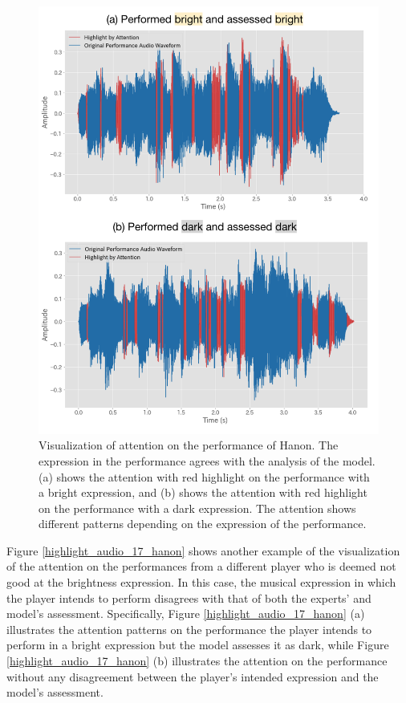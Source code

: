 \begin{figure}[h!]
  \centering
  \includegraphics[width=\linewidth]{figures/highlight_audio_0_hanon.png}
  \caption{Visualization of attention on the performance of Hanon. The expression in the performance agrees with the analysis of the model. (a) shows the attention with red highlight on the performance with a bright expression, and (b) shows the attention with red highlight on the performance with a dark expression. The attention shows different patterns depending on the expression of the performance.}
  \Description{}
  \label{highlight_audio_0_hanon}
\end{figure}

Figure \ref{highlight_audio_17_hanon} shows another example of the visualization of the attention on the performances from a different player who is deemed not good at the brightness expression.
In this case, the musical expression in which the player intends to perform disagrees with that of both the experts' and model's assessment.
Specifically, Figure \ref{highlight_audio_17_hanon} (a) illustrates the attention patterns on the performance the player intends to perform in a bright expression but the model assesses it as dark, while Figure \ref{highlight_audio_17_hanon} (b) illustrates the attention on the performance without any disagreement between the player's intended expression and the model's assessment.

